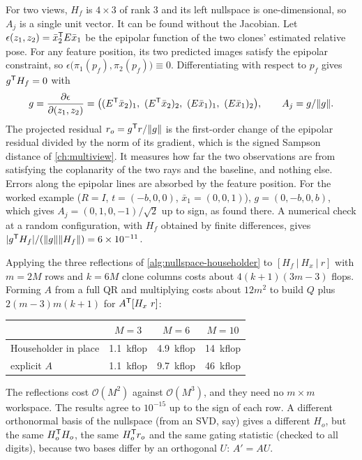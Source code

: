 \begin{solutions}
  \item For two views, $H_f$ is $4\times3$ of rank 3 and its left nullspace is one-dimensional, so $A_j$ is a single unit vector. It can be found without the Jacobian. Let
        $\epsilon(z_1, z_2) = \bar x_2^{\mathsf{T}} E\bar x_1$ be the epipolar function of the two clones' estimated relative pose. For any feature position, its two predicted images satisfy the epipolar
        constraint, so $\epsilon\big(\pi_1(p_f), \pi_2(p_f)\big) \equiv 0$. Differentiating with respect to $p_f$ gives $g^{\mathsf{T}} H_f = 0$ with
        \[
          g = \frac{\partial\epsilon}{\partial(z_1, z_2)} = \big((E^{\mathsf{T}}\bar x_2)_1,\ (E^{\mathsf{T}}\bar x_2)_2,\ (E\bar x_1)_1,\ (E\bar x_1)_2\big), \qquad A_j = g/\|g\| .
        \]
        The projected residual $r_o = g^{\mathsf{T}} r/\|g\|$ is the first-order change of the epipolar residual divided by the norm of its gradient, which is the signed Sampson distance of
        \cref{ch:multiview}. It measures how far the two observations are from satisfying the coplanarity of the two rays and the baseline, and nothing else.
        Errors along the epipolar lines are absorbed by the feature position. For the worked example ($R = I$, $t = (-b, 0, 0)$, $\bar x_1 = (0, 0, 1)$), $g = (0, -b, 0, b)$, which gives
        $A_j = (0, 1, 0, -1)/\sqrt2$ up to sign, as found there. A numerical check at a random configuration, with $H_f$ obtained by finite differences, gives
        $|g^{\mathsf{T}} H_f|/(\|g\|\|H_f\|) = 6\times10^{-11}$.

  \item Applying the three reflections of \cref{alg:nullspace-householder} to $[H_f\ |\ H_x\ |\ r]$ with $m = 2M$ rows and $k = 6M$ clone columns costs about $4(k + 1)(3m - 3)$ flops. Forming
        $A$ from a full QR and multiplying costs about $12m^2$ to build $Q$ plus $2(m - 3)m(k + 1)$ for $A^{\mathsf{T}}[H_x\ r]$:
        \begin{center}\small
        \begin{tabular}{@{}l c c c@{}}
        \toprule
        & $M = 3$ & $M = 6$ & $M = 10$ \\
        \midrule
        Householder in place & 1.1~kflop & 4.9~kflop & 14~kflop \\
        explicit $A$ & 1.1~kflop & 9.7~kflop & 46~kflop \\
        \bottomrule
        \end{tabular}
        \end{center}
        The reflections cost $\mathcal{O}(M^2)$ against $\mathcal{O}(M^3)$, and they need no $m\times m$ workspace. The results agree to $10^{-15}$ up to the sign of each row. A different
        orthonormal basis of the nullspace (from an SVD, say) gives a different $H_o$, but the same $H_o^{\mathsf{T}} H_o$, the same $H_o^{\mathsf{T}} r_o$ and the same gating statistic (checked to all
        digits), because two bases differ by an orthogonal $U$: $A' = AU$.


\end{solutions}
